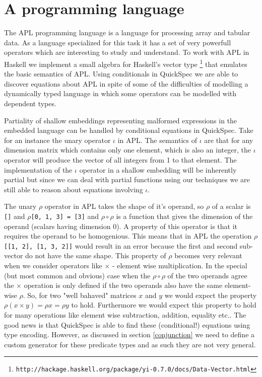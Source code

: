 \section{A programming language}\label{apl}
The APL programming language \cite{Iverson1962}
is a language for processing array and tabular data.
As a language specialized for this task it has a set of very powerfull
operators which are interesting to study and understand.
To work with APL in Haskell we implement a small
algebra for Haskell's vector type \footnote{\texttt{http://hackage.haskell.org/package/yi-0.7.0/docs/Data-Vector.html}}
that emulates the basic semantics of APL.
Using conditionals in QuickSpec we are able to discover
equations about APL in spite of some of the
difficulties of modelling a dynamically typed language
in which some operators can be modelled with dependent types.

Partiality of shallow embeddings representing malformed expressions in the
embedded language can be handled by conditional equations in QuickSpec.
Take for an instance the unary operator $\iota$ in APL. The semantics
of $\iota$ are that for any dimension matrix which contains only one element, which is also
an integer, the $\iota$ operator will produce the vector of all integers from 1 to that element.
The implementation of the $\iota$ operator in a shallow embedding will be inherently partial
but since we can deal with partial functions using our techniques we are still able to reason
about equations involving $\iota$.

The unary $\rho$ operator in APL takes the shape of it's operand,
so $\rho$ of a scalar is \texttt{[]} 
and $\rho$\texttt{[0, 1, 3] = [3]} and
$\rho\circ\rho$ is a function that gives the dimension of the operand (scalars having dimension 0).
A property of this operator is that it requires the operand to be homogenious.
This means that in APL the operation $\rho$\texttt{[[1, 2], [1, 3, 2]]}
would result in an error because the first and second sub-vector do not have the same shape.
This property of $\rho$ becomes very relevant when we consider operators like $\times$ - element wise
multiplication. In the special (but most common and obvious) case
when the $\rho\circ\rho$ of the two operands agree the $\times$ operation
is only defined if the two operands also have the same element-wise $\rho$. So, for two "well bahaved" matrices
$x$ and $y$ we would expect the property $\rho(x \times y) = \rho x = \rho y$ to hold. Furthermore
we would expect this property to hold for many operations like element wise subtraction, addition, equality etc..
The good news is that QuickSpec is able to find these (conditional!) equations using type encoding. However,
as discussed in section \ref{conjunction} we need to define a custom generator for these predicate types
and as such they are not very general.
